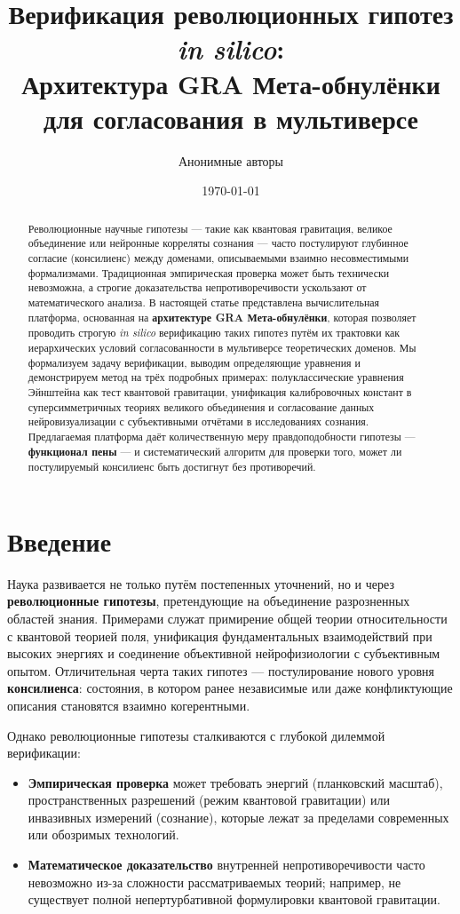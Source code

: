 \documentclass[11pt,a4paper]{article}
\title{\textbf{Верификация революционных гипотез \emph{in silico}:\\ Архитектура GRA Мета-обнулёнки для согласования в мультиверсе}}
\author{Анонимные авторы}
\date{\today}
\begin{document}
\maketitle

\begin{abstract}
Революционные научные гипотезы — такие как квантовая гравитация, великое объединение или нейронные корреляты сознания — часто постулируют глубинное согласие (консилиенс) между доменами, описываемыми взаимно несовместимыми формализмами. Традиционная эмпирическая проверка может быть технически невозможна, а строгие доказательства непротиворечивости ускользают от математического анализа. В настоящей статье представлена вычислительная платформа, основанная на \textbf{архитектуре GRA Мета-обнулёнки}, которая позволяет проводить строгую \emph{in silico} верификацию таких гипотез путём их трактовки как иерархических условий согласованности в мультиверсе теоретических доменов. Мы формализуем задачу верификации, выводим определяющие уравнения и демонстрируем метод на трёх подробных примерах: полуклассические уравнения Эйнштейна как тест квантовой гравитации, унификация калибровочных констант в суперсимметричных теориях великого объединения и согласование данных нейровизуализации с субъективными отчётами в исследованиях сознания. Предлагаемая платформа даёт количественную меру правдоподобности гипотезы — \textbf{функционал пены} — и систематический алгоритм для проверки того, может ли постулируемый консилиенс быть достигнут без противоречий.
\end{abstract}

\section{Введение}

Наука развивается не только путём постепенных уточнений, но и через \textbf{революционные гипотезы}, претендующие на объединение разрозненных областей знания. Примерами служат примирение общей теории относительности с квантовой теорией поля, унификация фундаментальных взаимодействий при высоких энергиях и соединение объективной нейрофизиологии с субъективным опытом. Отличительная черта таких гипотез — постулирование нового уровня \textbf{консилиенса}: состояния, в котором ранее независимые или даже конфликтующие описания становятся взаимно когерентными.

Однако революционные гипотезы сталкиваются с глубокой дилеммой верификации:
\begin{itemize}
    \item \textbf{Эмпирическая проверка} может требовать энергий (планковский масштаб), пространственных разрешений (режим квантовой гравитации) или инвазивных измерений (сознание), которые лежат за пределами современных или обозримых технологий.
    \item \textbf{Математическое доказательство} внутренней непротиворечивости часто невозможно из-за сложности рассматриваемых теорий; например, не существует полной непертурбативной формулировки квантовой гравитации.
\end{itemize}
\end{document}
